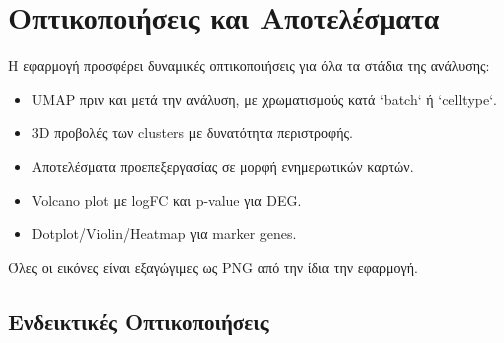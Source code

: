 \chapter{Οπτικοποιήσεις και Αποτελέσματα}

Η εφαρμογή προσφέρει δυναμικές οπτικοποιήσεις για όλα τα στάδια της ανάλυσης:

\begin{itemize}
  \item \foreignlanguage{english}{UMAP} πριν και μετά την ανάλυση, με χρωματισμούς κατά \foreignlanguage{english}{`batch`} ή \foreignlanguage{english}{`celltype`}.
  \item \foreignlanguage{english}{3D} προβολές των \foreignlanguage{english}{clusters} με δυνατότητα περιστροφής.
  \item Αποτελέσματα προεπεξεργασίας σε μορφή ενημερωτικών καρτών.
  \item \foreignlanguage{english}{Volcano plot} με \foreignlanguage{english}{logFC} και \foreignlanguage{english}{p-value} για \foreignlanguage{english}{DEG}.
  \item \foreignlanguage{english}{Dotplot/Violin/Heatmap} για \foreignlanguage{english}{marker genes}.
\end{itemize}

Όλες οι εικόνες είναι εξαγώγιμες ως \foreignlanguage{english}{PNG} από την ίδια την εφαρμογή.

\section*{Ενδεικτικές Οπτικοποιήσεις}

